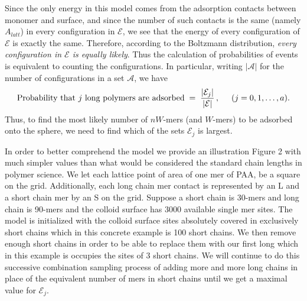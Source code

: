 \documentclass[journal=mamobx,manuscript=article]{achemso}
\begin{document}
Since the only energy in this model comes from the adsorption contacts between monomer and surface,
and since the number of such contacts is the same (namely $A_{latt}$) in every configuration
in $\mathcal{E}$, we see that the energy of every configuration of $\mathcal{E}$ is exactly the same.
Therefore, according to the Boltzmann distribution, \textit{every configuration in $\mathcal{E}$ is equally
likely}.  Thus the calculation of probabilities of events is equivalent to counting the configurations.
In particular, writing $|\mathcal{A}|$ for the number of configurations in a set $\mathcal{A}$, we have
\[
    \hbox{Probability that $j$ long polymers are adsorbed}  \;=\; 
    \frac{|\mathcal{E}_j|}{|\mathcal{E}|}\,,   \hspace{5mm}(j=0,1,\ldots,a).
\]
Thus, to find the most likely number of $nW$-mers (and $W$-mers) to be adsorbed onto the sphere,
we need to find which of the sets $\mathcal{E}_j$ is largest.


In order to better comprehend the model we provide an illustration Figure 2 with much simpler values than what would be considered the standard chain lengths in polymer science. We let each lattice point of area of one mer of PAA, be a square on the grid. Additionally, each long chain mer contact is represented by an L and a short chain mer by an S on the grid.  Suppose a short chain is 30-mers and long chain is 90-mers and the colloid surface has 3000 available single mer sites. The model is initialized with the colloid surface sites absolutely covered in exclusively short chains  which in this concrete example is 100 short chains. We then remove enough short chains in order to be able to replace them with our first long which in this example is occupies the sites of 3  short chains. We will continue to do this successive combination sampling process of adding more and more long chains in place of the equivalent number of mers in short chains until we get a maximal value for $\mathcal{E}_{j}$.
\end{document}
